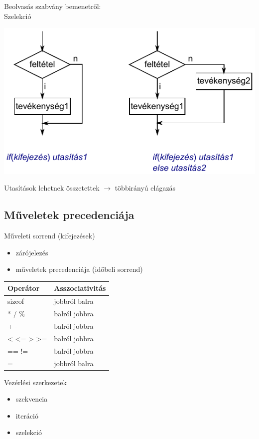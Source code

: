 \documentclass[usenames,dvipsnames,aspectratio=169]{beamer}
\begin{document}
\begin{frame}
  Beolvasás szabvány bemenetről:  \\
  \vfill
  Szelekció
  \vfill
  \begin{center}
    \includegraphics[width=.6\textwidth]{szelekcio.pdf}
  \end{center}
  \vfill
  Utasítások lehetnek összetettek $\rightarrow$ többirányú elágazás
\end{frame}

\subsection{Műveletek precedenciája}

\begin{frame}
  Műveleti sorrend (kifejezések)
  \begin{itemize}
    \item zárójelezés
    \item műveletek precedenciája (időbeli sorrend)
  \end{itemize}
  \begin{center}
    \begin{tabular}{ll}
    Operátor & Asszociativitás\\ \hline
    sizeof & jobbról balra\\
    * / \% & balról jobbra\\
    + - & balról jobbra\\
    < <= > >= & balról jobbra\\
    == != & balról jobbra\\
    = & jobbról balra\\
    \end{tabular}
  \end{center}
  Vezérlési szerkezetek
  \begin{itemize}
    \item szekvencia
    \item iteráció
    \item szelekció
  \end{itemize}
\end{frame}
\end{document}
